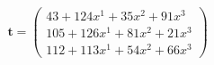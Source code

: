 \documentclass[preview]{standalone}
\begin{document}
\begin{align*}
\mathbf{t} = \begin{pmatrix}43 + 124x^{1} + 35x^{2} + 91x^{3} \\ 105 + 126x^{1} + 81x^{2} + 21x^{3} \\ 112 + 113x^{1} + 54x^{2} + 66x^{3}\end{pmatrix}
\end{align*}
\end{document}
